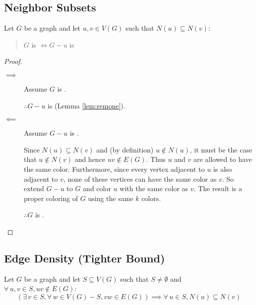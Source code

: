 \subsection{Neighbor Subsets}

\begin{lemma}
  \label{lem:subset}
  Let \(G\) be a graph and let \(u,v\in V(G)\) such that \(N(u)\subseteq N(v)\):
  \begin{quote}
    \(G\) is  \(\iff G-u\) is 
  \end{quote}
\end{lemma}

\begin{proof}
  \begin{description}
  \item[]
  \item[\(\implies\)] Assume \(G\) is .

    \(\therefore G-u\) is  (Lemma \ref{lem:remone}).

  \item[\(\impliedby\)] Assume \(G-u\) is .

    Since \(N(u)\subseteq N(v)\) and (by definition) \(u\notin N(u)\), it must be the case that \(u\notin N(v)\) and hence
    \(uv\notin E(G)\).  Thus \(u\) and \(v\) are allowed to have the same color.  Furthermore, since every vertex adjacent to
    \(u\) is also adjacent to \(v\), none of these vertices can have the same color as \(v\).  So extend \(G-u\) to \(G\) and
    color \(u\) with the same color as \(v\).  The result is a proper coloring of \(G\) using the same \(k\) colors.

    \(\therefore G\) is .
  \end{description}
\end{proof}

\subsection{Edge Density (Tighter Bound)}

\begin{lemma}
  \label{lem:neighbor}
  Let \(G\) be a graph and let \(S\subseteq V(G)\) such that \(S\ne\emptyset\) and \(\forall\,u,v\in S,uv\notin E(G)\):
  \[\left(\exists\,v\in S,\forall\,w\in V(G)-S,vw\in E(G)\right)\implies\forall\,u\in S,N(u)\subseteq N(v)\]
\end{lemma}

